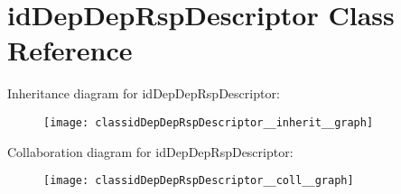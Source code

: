 \hypertarget{classidDepDepRspDescriptor}{}\section{id\+Dep\+Dep\+Rsp\+Descriptor Class Reference}
\label{classidDepDepRspDescriptor}


Inheritance diagram for id\+Dep\+Dep\+Rsp\+Descriptor\+:\nopagebreak
\begin{figure}[H]
\begin{center}
\leavevmode
\texttt{[image: classidDepDepRspDescriptor\_\_inherit\_\_graph]}
\end{center}
\end{figure}


Collaboration diagram for id\+Dep\+Dep\+Rsp\+Descriptor\+:\nopagebreak
\begin{figure}[H]
\begin{center}
\leavevmode
\texttt{[image: classidDepDepRspDescriptor\_\_coll\_\_graph]}
\end{center}
\end{figure}

